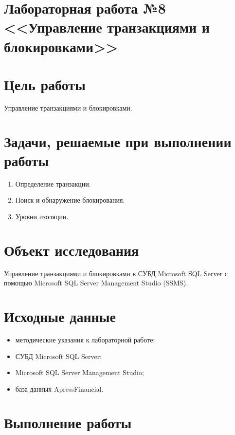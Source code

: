 \documentclass[a4paper, 14pt]{extarticle}
\begin{document}
\setcounter{page}{2}

\linespread{1.5}
\renewcommand{\baselinestretch}{1.5}

\section*{
  \large{Лабораторная работа №8 <<Управление транзакциями и блокировками>>}
 }

\section{Цель работы}

Управление транзакциями и блокировками.

\section{Задачи, решаемые при выполнении работы}

\begin{enumerate}[leftmargin=*]
  \item Определение транзакции.
  \item Поиск и обнаружение блокирования.
  \item Уровни изоляции.
\end{enumerate}

\section{Объект исследования}

Управление транзакциями и блокировками в СУБД
\foreignlanguage{english}{Microsoft SQL Server} с помощью
\foreignlanguage{english}{Microsoft SQL Server Management Studio (SSMS)}.

\section{Исходные данные}

\begin{itemize}
  \item методические указания к лабораторной работе;
  \item СУБД Microsoft SQL Server;
  \item Microsoft SQL Server Management Studio;
  \item база данных ApressFinancial.
\end{itemize}

\section{Выполнение работы}
\end{document}
